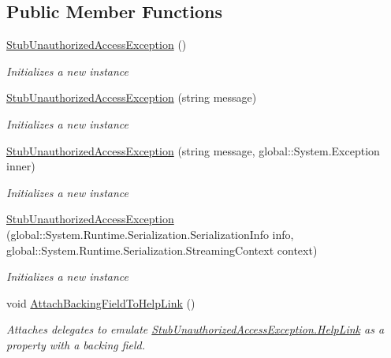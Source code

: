 \subsection*{Public Member Functions}
\begin{DoxyCompactItemize}
\item 
\hyperlink{class_system_1_1_fakes_1_1_stub_unauthorized_access_exception_a4cee15d9ba834069719b8197429ca096}{Stub\-Unauthorized\-Access\-Exception} ()
\begin{DoxyCompactList}\small\item\em Initializes a new instance\end{DoxyCompactList}\item 
\hyperlink{class_system_1_1_fakes_1_1_stub_unauthorized_access_exception_a76c09b5d17c23dc8e7155cc482295543}{Stub\-Unauthorized\-Access\-Exception} (string message)
\begin{DoxyCompactList}\small\item\em Initializes a new instance\end{DoxyCompactList}\item 
\hyperlink{class_system_1_1_fakes_1_1_stub_unauthorized_access_exception_a09a3525a0e7eb53f8bae7cca214abc37}{Stub\-Unauthorized\-Access\-Exception} (string message, global\-::\-System.\-Exception inner)
\begin{DoxyCompactList}\small\item\em Initializes a new instance\end{DoxyCompactList}\item 
\hyperlink{class_system_1_1_fakes_1_1_stub_unauthorized_access_exception_ac12f56bab3b64334cce8746bff553607}{Stub\-Unauthorized\-Access\-Exception} (global\-::\-System.\-Runtime.\-Serialization.\-Serialization\-Info info, global\-::\-System.\-Runtime.\-Serialization.\-Streaming\-Context context)
\begin{DoxyCompactList}\small\item\em Initializes a new instance\end{DoxyCompactList}\item 
void \hyperlink{class_system_1_1_fakes_1_1_stub_unauthorized_access_exception_aa68aaebeed176ef73a607932d30919a4}{Attach\-Backing\-Field\-To\-Help\-Link} ()
\begin{DoxyCompactList}\small\item\em Attaches delegates to emulate \hyperlink{class_system_1_1_fakes_1_1_stub_unauthorized_access_exception_a395d536d40744d67f0d5a86b81c6d4f6}{Stub\-Unauthorized\-Access\-Exception.\-Help\-Link} as a property with a backing field.\end{DoxyCompactList}\item 

\end{DoxyCompactItemize}
